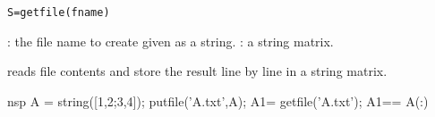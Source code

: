 
\begin{mandesc}
\end{mandesc}
\begin{calling_sequence}
\begin{verbatim}
S=getfile(fname)
\end{verbatim}
\end{calling_sequence}
\begin{parameters}
  \begin{varlist}
    : the file name to create given as a string.
    : a string matrix.
  \end{varlist}
\end{parameters}

\begin{mandescription}
reads file contents and store the result line by line in a string matrix.
\end{mandescription}

\begin{examples}
  \begin{mintednsp}{nsp}
    A = string([1,2;3,4]);
    putfile('A.txt',A);
    A1= getfile('A.txt');
    A1== A(:)
  \end{mintednsp}
\end{examples}


\begin{manseealso}
\end{manseealso}
